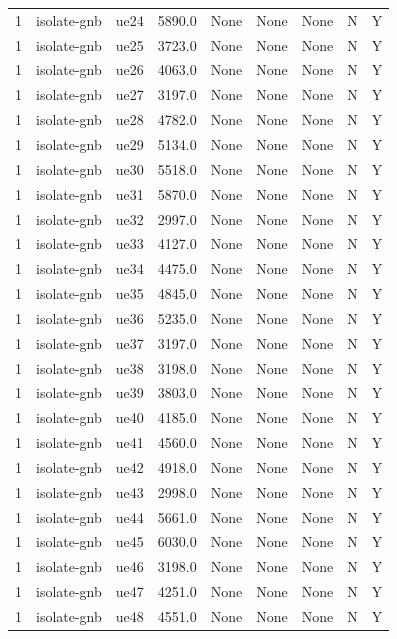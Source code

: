 \begin{table}[ht]
\begin{tabular}{|c|c|c|c|c|c|c|c|c|}
1 & isolate-gnb & ue24 & 5890.0 & None & None & None & N & Y \\
1 & isolate-gnb & ue25 & 3723.0 & None & None & None & N & Y \\
1 & isolate-gnb & ue26 & 4063.0 & None & None & None & N & Y \\
1 & isolate-gnb & ue27 & 3197.0 & None & None & None & N & Y \\
1 & isolate-gnb & ue28 & 4782.0 & None & None & None & N & Y \\
1 & isolate-gnb & ue29 & 5134.0 & None & None & None & N & Y \\
1 & isolate-gnb & ue30 & 5518.0 & None & None & None & N & Y \\
1 & isolate-gnb & ue31 & 5870.0 & None & None & None & N & Y \\
1 & isolate-gnb & ue32 & 2997.0 & None & None & None & N & Y \\
1 & isolate-gnb & ue33 & 4127.0 & None & None & None & N & Y \\
1 & isolate-gnb & ue34 & 4475.0 & None & None & None & N & Y \\
1 & isolate-gnb & ue35 & 4845.0 & None & None & None & N & Y \\
1 & isolate-gnb & ue36 & 5235.0 & None & None & None & N & Y \\
1 & isolate-gnb & ue37 & 3197.0 & None & None & None & N & Y \\
1 & isolate-gnb & ue38 & 3198.0 & None & None & None & N & Y \\
1 & isolate-gnb & ue39 & 3803.0 & None & None & None & N & Y \\
1 & isolate-gnb & ue40 & 4185.0 & None & None & None & N & Y \\
1 & isolate-gnb & ue41 & 4560.0 & None & None & None & N & Y \\
1 & isolate-gnb & ue42 & 4918.0 & None & None & None & N & Y \\
1 & isolate-gnb & ue43 & 2998.0 & None & None & None & N & Y \\
1 & isolate-gnb & ue44 & 5661.0 & None & None & None & N & Y \\
1 & isolate-gnb & ue45 & 6030.0 & None & None & None & N & Y \\
1 & isolate-gnb & ue46 & 3198.0 & None & None & None & N & Y \\
1 & isolate-gnb & ue47 & 4251.0 & None & None & None & N & Y \\
1 & isolate-gnb & ue48 & 4551.0 & None & None & None & N & Y \\

\end{tabular}
\end{table}
